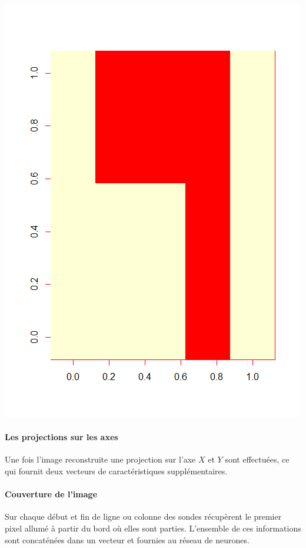 \begin{minipage}{0.2\linewidth}
\includegraphics[width = \textwidth]{Figures/data9}
\end{minipage}




\paragraph{Les projections sur les axes} Une fois l'image reconstruite une projection sur l'axe $X$ et $Y$ sont effectuées, ce qui fournit deux vecteurs de caractéristiques supplémentaires.
\paragraph{Couverture de l'image} Sur chaque début et fin de ligne ou colonne des sondes récupèrent le premier pixel allumé à partir du bord où elles sont parties. L'ensemble de ces informations sont concaténées dans un vecteur et fournies au réseau de neurones.


